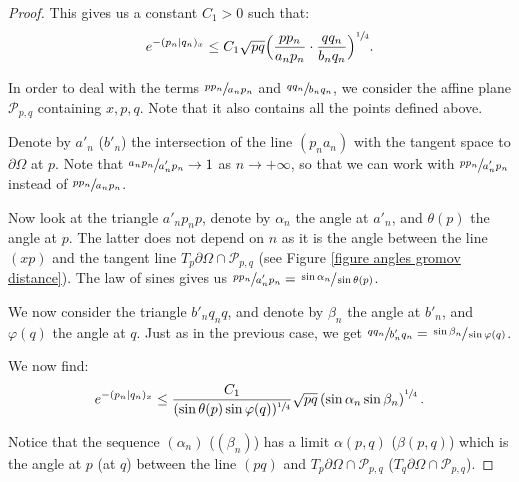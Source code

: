 \documentclass[JEP,XML,SOM,Unicode,NoEqCountersInSection,NoFloatCountersInSection,published]{cedram}
\theoremstyle{definition}
\let\p\varphi
\begin{document}
\begin{proof}
This gives us a constant $C_1>0$ such that:
\[ e^{-(p_n\vert q_n)_x} \leq C_1 \sqrt{pq} \Bigl( \frac{pp_n}{a_np_n}\cdot \frac{qq_n}{b_nq_n}\Bigr)^{\sfrac{1}{4}}. \]

In order to deal with the terms $\sfrac{pp_n}{a_np_n}$ and $\sfrac{qq_n}{b_nq_n}$, we consider the affine plane $\mathcal P_{p,q}$ containing $x,p,q$. Note that it also contains all the points defined above.

Denote by $a'_n$ (\resp $b'_n$) the intersection of the line $(p_na_n)$ with the tangent space to $\partial \Omega$ at $p$. Note that $\sfrac{a_np_n}{a'_np_n}\to 1$ as $n\to +\infty$, so that we can work with $\sfrac{pp_n}{a'_np_n}$ instead of $\sfrac{pp_n}{a_np_n}$.

Now look at the triangle $a'_np_np$, denote by $\alpha_n$ the angle at $a'_n$, and $\theta(p)$ the angle at $p$. The latter does not depend on $n$ as it is the angle between the line $(xp)$ and the tangent line $T_p\partial\Omega \cap \mathcal P_{p,q}$ (see Figure \ref{figure angles gromov distance}). The law of sines gives us $\sfrac{pp_n}{a'_np_n}=\sfrac{\sin \alpha_n}{\sin \theta(p)}$.

We now consider the triangle $b'_nq_nq$, and denote by $\beta_n$ the angle at $b'_n$, and $\p(q)$ the angle at $q$. Just as in the previous case, we get $\sfrac{qq_n}{b'_nq_n}=\sfrac{\sin \beta_n}{\sin\p(q)}$.

We now find:
\[ e^{-(p_n\vert q_n)_x} \leq \frac{C_1}{(\sin \theta(p) \sin \p(q))^{\sfrac{1}{4}}} \sqrt{pq} \left( \sin \alpha_n \sin \beta_n \right)^{\sfrac{1}{4}}. \]

Notice that the sequence $(\alpha_n)$ (\resp $(\beta_n)$) has a limit $\alpha(p,q)$ (\resp $\beta(p,q)$) which is the angle at $p$ (\resp at $q$) between the line $(pq)$ and $T_p\partial\Omega \cap \mathcal P_{p,q}$ (\resp $T_q\partial\Omega \cap \mathcal P_{p,q}$).


\end{proof}
\end{document}
